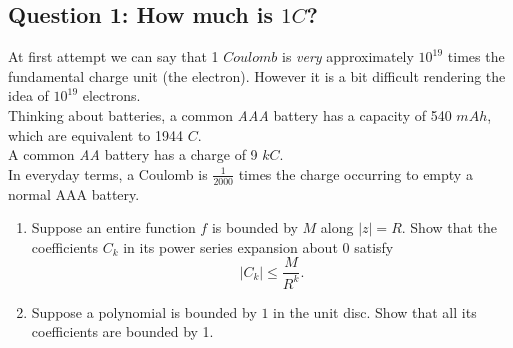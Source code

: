 \documentclass[12pt]{article}
\newcommand{\I}{\textit}
\newenvironment{problem}[2][Problem]{\begin{trivlist}
\item[\hskip \labelsep {\bfseries #1}\hskip \labelsep {\bfseries #2.}]}{\end{trivlist}}
\begin{document}
\subsection*{Question 1: How much is $1 C$?}
At first attempt we can say that 1 $Coulomb$ is \I{very} approximately $10^{19}$ times the fundamental charge unit (the electron). However it is a bit difficult rendering the idea of $10^{19}$ electrons. \\
Thinking about batteries, a common \I{AAA} battery has a capacity of 540 $mAh$, which are equivalent to 1944 $C$. \\
A common \I{AA} battery has a charge of 9 $kC$. \\
In everyday terms, a Coulomb is $\frac{1}{2000}$ times the charge occurring to empty a normal AAA battery.








\newpage
\begin{problem}{6}
\begin{enumerate}[label=\alph*)]
    \item Suppose an entire function $f$ is bounded by $M$ along $|z|=R$. Show that the coefficients $C_k$ in its power series expansion about $0$ satisfy
    \[
    |C_k|\leq\frac{M}{R^k}.
    \]
    \item Suppose a polynomial is bounded by $1$ in the unit disc. Show that all its coefficients are bounded by 1.
\end{enumerate}
\end{problem}
\end{document}
